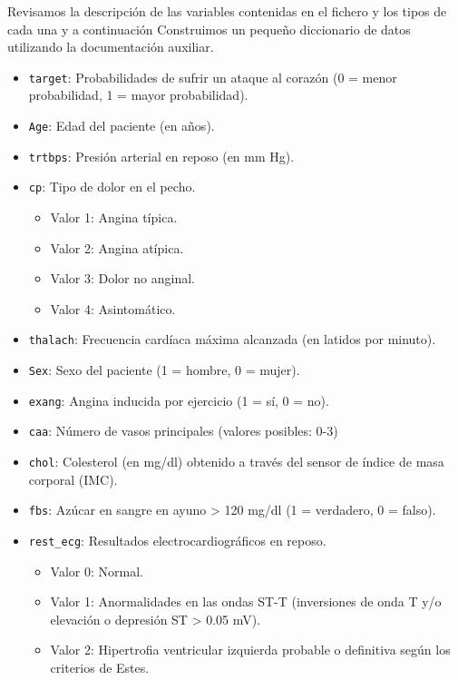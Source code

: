 \documentclass[
]{article}
\providecommand{\tightlist}{%
  \setlength{\itemsep}{0pt}\setlength{\parskip}{0pt}}
\begin{document}
Revisamos la descripción de las variables contenidas en el fichero y los
tipos de cada una y a continuación Construimos un pequeño diccionario de
datos utilizando la documentación auxiliar.

\begin{itemize}
\tightlist
\item
  \texttt{target}: Probabilidades de sufrir un ataque al corazón (0 =
  menor probabilidad, 1 = mayor probabilidad).
\item
  \texttt{Age}: Edad del paciente (en años).
\item
  \texttt{trtbps}: Presión arterial en reposo (en mm Hg).
\item
  \texttt{cp}: Tipo de dolor en el pecho.

  \begin{itemize}
  \tightlist
  \item
    Valor 1: Angina típica.
  \item
    Valor 2: Angina atípica.
  \item
    Valor 3: Dolor no anginal.
  \item
    Valor 4: Asintomático.
  \end{itemize}
\item
  \texttt{thalach}: Frecuencia cardíaca máxima alcanzada (en latidos por
  minuto).
\item
  \texttt{Sex}: Sexo del paciente (1 = hombre, 0 = mujer).
\item
  \texttt{exang}: Angina inducida por ejercicio (1 = sí, 0 = no).
\item
  \texttt{caa}: Número de vasos principales (valores posibles: 0-3)
\item
  \texttt{chol}: Colesterol (en mg/dl) obtenido a través del sensor de
  índice de masa corporal (IMC).
\item
  \texttt{fbs}: Azúcar en sangre en ayuno \textgreater{} 120 mg/dl (1 =
  verdadero, 0 = falso).
\item
  \texttt{rest\_ecg}: Resultados electrocardiográficos en reposo.

  \begin{itemize}
  \tightlist
  \item
    Valor 0: Normal.
  \item
    Valor 1: Anormalidades en las ondas ST-T (inversiones de onda T y/o
    elevación o depresión ST \textgreater{} 0.05 mV).
  \item
    Valor 2: Hipertrofia ventricular izquierda probable o definitiva
    según los criterios de Estes.
  \end{itemize}
\end{itemize}
\end{document}

